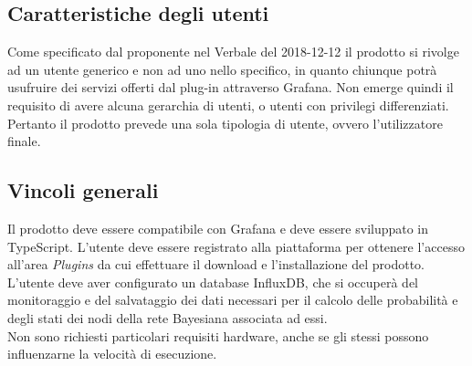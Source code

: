 \subsection{Caratteristiche degli utenti}
Come specificato dal proponente nel Verbale del 2018-12-12 il prodotto si rivolge ad un utente generico e non ad uno nello specifico, in quanto chiunque potrà usufruire dei servizi offerti dal plug-in attraverso Grafana. Non emerge quindi il requisito di avere alcuna gerarchia di utenti, o utenti con privilegi differenziati. Pertanto il prodotto prevede una sola tipologia di utente, ovvero l’utilizzatore finale.

\subsection{Vincoli generali}
Il prodotto deve essere compatibile con Grafana e deve essere sviluppato in TypeScript. L'utente deve essere registrato alla piattaforma per ottenere l'accesso all'area \emph{Plugins} da cui effettuare il download e l'installazione del prodotto.
L'utente deve aver configurato un database InfluxDB, che si occuperà del monitoraggio e del salvataggio dei dati necessari per il calcolo delle probabilità e degli stati dei nodi della rete Bayesiana associata ad essi. \\
Non sono richiesti particolari requisiti hardware, anche se gli stessi possono influenzarne la velocità di esecuzione.

\pagebreak
